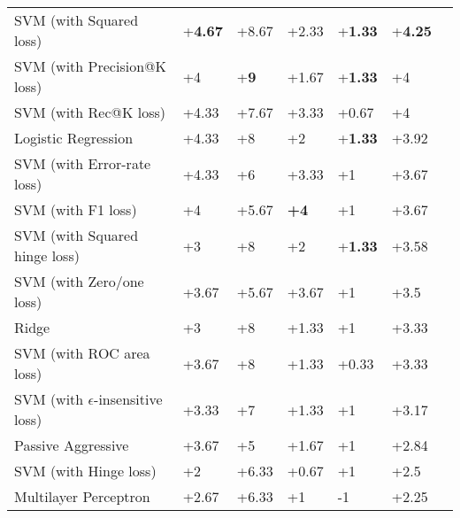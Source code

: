 \begin{table}[h!]
{\begin{tabular}{@{}lllllll@{}}
SVM (with Squared loss)                               & +\textbf{4.67}  & +8.67     & +2.33           & +\textbf{1.33}     & +\textbf{4.25} \\
SVM (with Precision@K loss)                            & +4              & +\textbf{9}                 & +1.67           & +\textbf{1.33}     & +4             \\
SVM (with Rec@K loss)                                 & +4.33           & +7.67              & +3.33           & +0.67              & +4             \\
Logistic Regression                                    & +4.33           & +8                 & +2              & +\textbf{1.33}     & +3.92          \\
SVM (with Error-rate loss)                             & +4.33           & +6                 & +3.33           & +1                 & +3.67          \\
SVM (with F1 loss)                                     & +4              & +5.67              & \textbf{+4}     & +1                 & +3.67          \\
SVM (with Squared hinge loss)                           & +3              & +8                 & +2              & +\textbf{1.33}     & +3.58          \\
SVM (with Zero/one loss)                               & +3.67           & +5.67              & +3.67		  & +1                 & +3.5           \\
Ridge                                                   & +3              & +8                 & +1.33           & +1                 & +3.33          \\
SVM (with ROC area loss)                                & +3.67           & +8                 & +1.33           & +0.33              & +3.33          \\
SVM (with $\epsilon$-insensitive loss)                   & +3.33           & +7                 & +1.33           & +1                 & +3.17          \\
Passive Aggressive                                       & +3.67           & +5                 & +1.67           & +1                 & +2.84          \\
SVM (with Hinge loss)                                    & +2              & +6.33              & +0.67           & +1                 & +2.5           \\
Multilayer Perceptron                                 & +2.67           & +6.33              & +1              & -1                & +2.25          \\

\end{tabular}}
\end{table}
